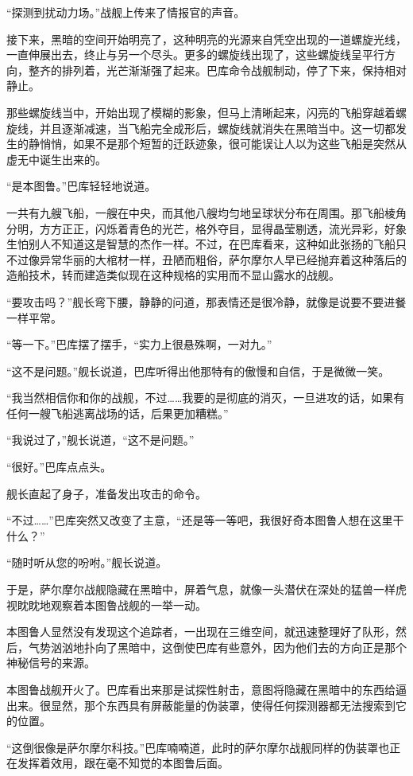 “探测到扰动力场。”战舰上传来了情报官的声音。 

接下来，黑暗的空间开始明亮了，这种明亮的光源来自凭空出现的一道螺旋光线，一直伸展出去，终止与另一个尽头。更多的螺旋线出现了，这些螺旋线呈平行方向，整齐的排列着，光芒渐渐强了起来。巴库命令战舰制动，停了下来，保持相对静止。 

那些螺旋线当中，开始出现了模糊的影象，但马上清晰起来，闪亮的飞船穿越着螺旋线，并且逐渐减速，当飞船完全成形后，螺旋线就消失在黑暗当中。这一切都发生的静悄悄，如果不是那个短暂的迁跃迹象，很可能误让人以为这些飞船是突然从虚无中诞生出来的。 

“是本图鲁。”巴库轻轻地说道。 

一共有九艘飞船，一艘在中央，而其他八艘均匀地呈球状分布在周围。那飞船棱角分明，方方正正，闪烁着青色的光芒，格外夺目，显得晶莹剔透，流光异彩，好象生怕别人不知道这是智慧的杰作一样。不过，在巴库看来，这种如此张扬的飞船只不过像异常华丽的大棺材一样，丑陋而粗俗，萨尔摩尔人早已经抛弃着这种落后的造船技术，转而建造类似现在这种规格的实用而不显山露水的战舰。 

“要攻击吗？”舰长弯下腰，静静的问道，那表情还是很冷静，就像是说要不要进餐一样平常。 

“等一下。”巴库摆了摆手，“实力上很悬殊啊，一对九。” 

“这不是问题。”舰长说道，巴库听得出他那特有的傲慢和自信，于是微微一笑。 

“我当然相信你和你的战舰，不过……我要的是彻底的消灭，一旦进攻的话，如果有任何一艘飞船逃离战场的话，后果更加糟糕。” 

“我说过了，”舰长说道，“这不是问题。” 

“很好。”巴库点点头。 

舰长直起了身子，准备发出攻击的命令。 

“不过……”巴库突然又改变了主意，“还是等一等吧，我很好奇本图鲁人想在这里干什么？” 

“随时听从您的吩咐。”舰长说道。 

于是，萨尔摩尔战舰隐藏在黑暗中，屏着气息，就像一头潜伏在深处的猛兽一样虎视眈眈地观察着本图鲁战舰的一举一动。 

本图鲁人显然没有发现这个追踪者，一出现在三维空间，就迅速整理好了队形，然后，气势汹汹地扑向了黑暗中，这倒使巴库有些意外，因为他们去的方向正是那个神秘信号的来源。 

本图鲁战舰开火了。巴库看出来那是试探性射击，意图将隐藏在黑暗中的东西给逼出来。很显然，那个东西具有屏蔽能量的伪装罩，使得任何探测器都无法搜索到它的位置。 

“这倒很像是萨尔摩尔科技。”巴库喃喃道，此时的萨尔摩尔战舰同样的伪装罩也正在发挥着效用，跟在毫不知觉的本图鲁后面。 

